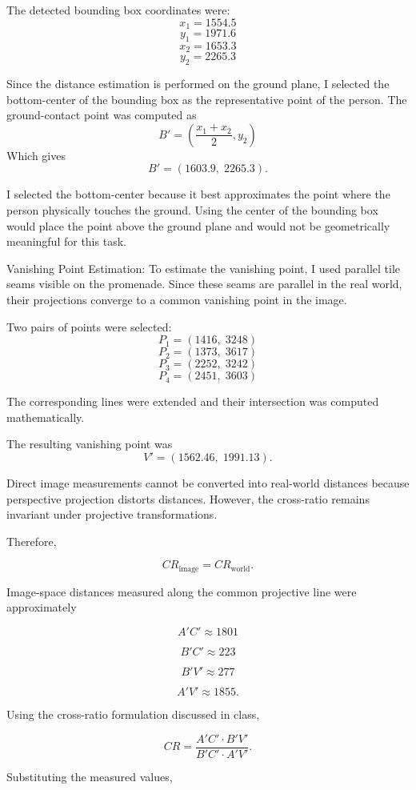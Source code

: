 \begin{enumerate}
\begin{studentSpace}
    The detected bounding box coordinates were:
    \[x_1 = 1554.5\]
    \[y_1 = 1971.6\]
    \[x_2 = 1653.3\]
    \[y_2 = 2265.3\]
    
    Since the distance estimation is performed on the ground plane, I selected the bottom-center of the bounding box as the representative point of the person.
    The ground-contact point was computed as
    \[B'= \left(\frac{x_1+x_2}{2},y_2\right)\]
    Which gives \[B'=(1603.9,\;2265.3).\]
    
    I selected the bottom-center because it best approximates the point where the person physically touches the ground. Using the center of the bounding box would place the point above the ground plane and would not be geometrically meaningful for this task.

    \par Vanishing Point Estimation: 
    To estimate the vanishing point, I used parallel tile seams visible on the promenade. Since these seams are parallel in the real world, their projections converge to a common vanishing point in the image.
    
    Two pairs of points were selected:
    \[P_1=(1416,\;3248)\]
    \[P_2=(1373,\;3617)\]
    \[P_3=(2252,\;3242)\]
    \[P_4=(2451,\;3603)\]
    
    The corresponding lines were extended and their intersection was computed mathematically. 
    
    The resulting vanishing point was
    \[V'=(1562.46,\;1991.13).\]

    Direct image measurements cannot be converted into real-world distances because perspective projection distorts distances. However, the cross-ratio remains invariant under projective transformations.

Therefore,

\[
CR_{\text{image}}
=
CR_{\text{world}}.
\]

Image-space distances measured along the common projective line were approximately

\[
A'C' \approx 1801
\]

\[
B'C' \approx 223
\]

\[
B'V' \approx 277
\]

\[
A'V' \approx 1855.
\]

Using the cross-ratio formulation discussed in class,

\[
CR
=
\frac{A'C' \cdot B'V'}
     {B'C' \cdot A'V'}.
\]

Substituting the measured values,


\end{studentSpace}
\end{enumerate}
